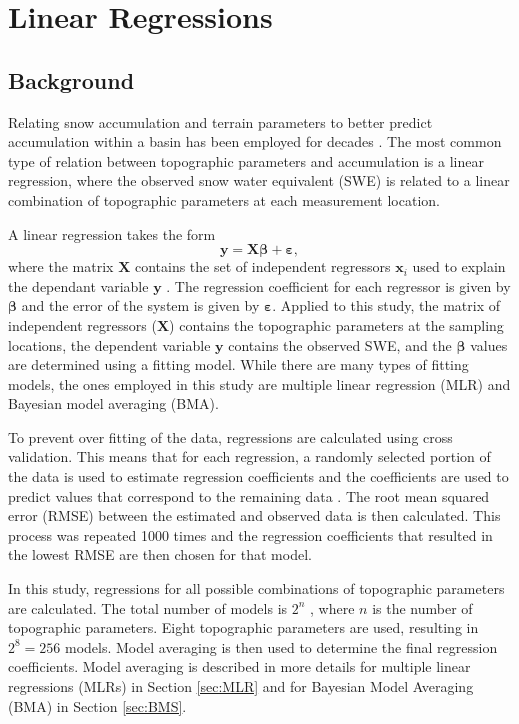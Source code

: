 \documentclass[12pt]{article}
\renewcommand{\vector}[1]{\mathbf{#1}}
\begin{document}
\section{Linear Regressions}
\label{sec:linearregression}

\subsection{Background}
Relating snow accumulation and terrain parameters to better predict accumulation within a basin has been employed for decades \citep[e.g.][]{Woo1978, Molotch2005, McGrath2015}. The most common type of relation between topographic parameters and accumulation is a linear regression, where the observed snow water equivalent (SWE) is related to a linear combination of topographic parameters at each measurement location. 

A linear regression takes the form
\begin{equation}
\vector{y} = \vector{X} \bm{\beta} + \bm{\varepsilon},
\end{equation}
where the matrix $\vector{X}$ contains the set of independent regressors $\vector{x}_i$ used to explain the dependant variable $\vector{y}$ \citep[e.g.][]{Davis1986}. The regression coefficient for each regressor is given by $\bm{\beta}$ and the error of the system is given by $\bm{\varepsilon}$. Applied to this study, the matrix of independent regressors ($\vector{X}$) contains the topographic parameters at the sampling locations, the dependent variable $\vector{y}$ contains the observed SWE, and the $\bm{\beta}$ values are determined using a fitting model. While there are many types of fitting models, the ones employed in this study are multiple linear regression (MLR) and Bayesian model averaging (BMA).

To prevent over fitting of the data, regressions are calculated using cross validation. This means that for each regression, a randomly selected portion of the data is used to estimate regression coefficients and the coefficients are used to predict values that correspond to the remaining data \citep{Kohavi1995}. The root mean squared error (RMSE) between the estimated and observed data is then calculated. This process was repeated 1000 times and the regression coefficients that resulted in the lowest RMSE are then chosen for that model. 

In this study, regressions for all possible combinations of topographic parameters are calculated. The total number of models is $2^n$ , where $n$ is the number of topographic parameters. Eight topographic parameters are used, resulting in $2^8 = 256$ models. Model averaging is then used to determine the final regression coefficients. Model averaging is described in more details for multiple linear regressions (MLRs) in Section \ref{sec:MLR} and for Bayesian Model Averaging (BMA) in Section \ref{sec:BMS}.
\end{document}
